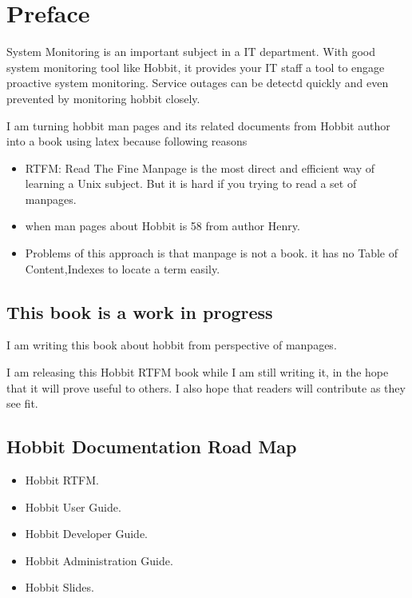\chapter{Preface}
\label{chap:preface}

System Monitoring is an important subject in a IT department. With
good system monitoring tool like Hobbit, it provides your IT staff a
tool to engage proactive system monitoring. Service outages
can be detectd quickly and even prevented by monitoring hobbit
closely.

I am turning hobbit man pages and its related documents from Hobbit
author into a book using latex because following reasons

\begin{itemize}
\item RTFM: Read The Fine Manpage is the most direct and efficient way of
learning a Unix subject. But it is hard if you trying to read a set of manpages.
\item  when man pages about Hobbit is 58 from author Henry.
\item Problems of this approach is that manpage is not a book. it has no
Table of Content,Indexes to locate a term easily.

\end{itemize}

\section{This book is a work in progress}

I am writing this  book about hobbit from perspective of manpages.  

I am releasing this Hobbit RTFM book while I am still writing it, in the hope that
it will prove useful to others.  I also hope that readers will contribute as they see fit.

\section{Hobbit Documentation Road Map}


\begin{itemize}
\item Hobbit RTFM.
\item Hobbit User Guide.
\item Hobbit Developer Guide.
\item Hobbit Administration Guide.
\item Hobbit Slides.

\end{itemize}

